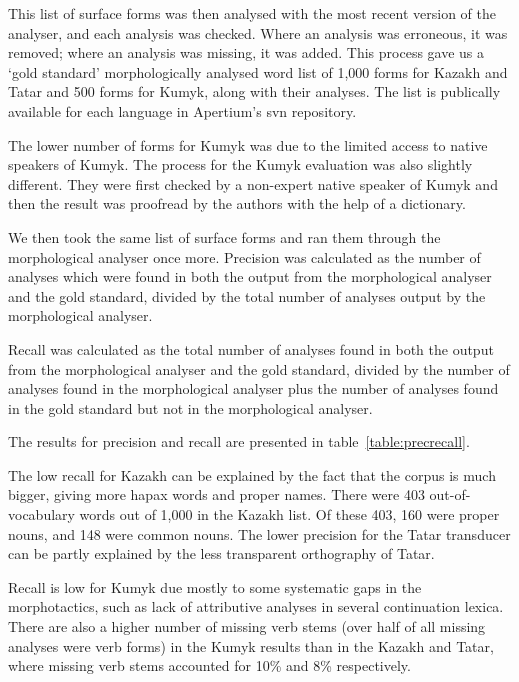 \documentclass[a4paper,11pt,twocolumn]{article}
\begin{document}
This list of surface forms was then analysed with the most recent version of the analyser, and each analysis was checked.  Where an analysis was erroneous, it was removed; where an analysis was missing, it was added.  This process gave us a `gold standard' morphologically analysed word list of 1,000 forms for Kazakh and Tatar and 500 forms for Kumyk, along with their analyses.  The list is publically available for each language in Apertium's svn repository.%

The lower number of forms for Kumyk was due to the limited access to native speakers of Kumyk. 
The process for the Kumyk evaluation was also slightly different. They were first checked by a non-expert native speaker of Kumyk and then the result was proofread by the authors with the help of a dictionary.

We then took the same list of surface forms and ran them through the morphological analyser once more.  Precision was calculated as the number of analyses which were found in both the output from the morphological analyser and the gold standard, divided by the total number of analyses output by the morphological analyser.

Recall was calculated as the total number of analyses found in both the output from the morphological analyser and the gold standard, divided by the number of analyses found in the morphological analyser plus the number of analyses found in the gold standard but not in the morphological analyser.

The results for precision and recall are presented in table~\ref{table:precrecall}. 

The low recall for Kazakh can be explained by the fact that the corpus is much bigger, giving 
more hapax words and proper names. There were 403 out-of-vocabulary words out of 1,000 in the Kazakh list.
Of these 403, 160 were proper nouns, and 148 were common nouns. The lower precision for the 
Tatar transducer can be partly explained by the less transparent orthography of Tatar.  


Recall is low for Kumyk due mostly to some systematic gaps in the morphotactics, such as lack of attributive analyses in several continuation lexica. There are also a higher number of missing verb stems (over half of all missing analyses were verb forms) in the Kumyk results than in the Kazakh and Tatar, where missing verb stems accounted for 10\% and 8\% respectively. 
\end{document}
